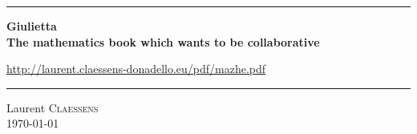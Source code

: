 
\thispagestyle{empty}
\begin{center}
  \begin{minipage}{15cm}
    \hrule\par
    \vspace{2mm}
    \begin{center}
    \Huge \bfseries  Giulietta \\
    \large
    The mathematics book which wants to be collaborative
    \par
    \normalsize
    \url{http://laurent.claessens-donadello.eu/pdf/mazhe.pdf}
    \end{center}
    \hrule\par
  \end{minipage}
\end{center}

\vspace{2cm}

\begin{center}
    Laurent \textsc{Claessens}\\
    \today\\
    \texttt{\GitCommitHexsha}
\end{center}

\vfill

\LogoEtLicence
\clearpage


